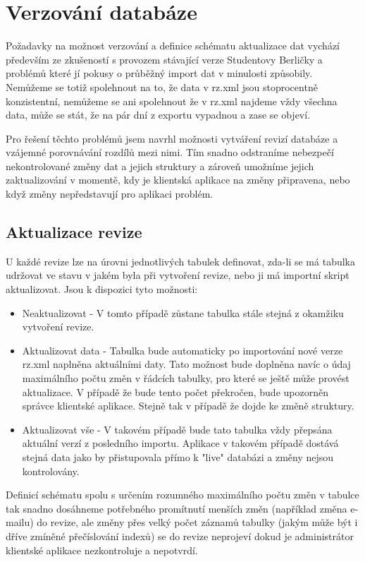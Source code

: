 \documentclass[11pt,twoside,a4paper]{book}
\begin{document}
\section{Verzování databáze}
Požadavky na možnost verzování a definice schématu aktualizace dat vychází především ze zkušeností s provozem stávající verze Studentovy Berličky a problémů které jí pokusy o průběžný import dat v minulosti způsobily. Nemůžeme se totiž spolehnout na to, že data v rz.xml jsou stoprocentně konzistentní, nemůžeme se ani spolehnout že v rz.xml najdeme vždy všechna data, může se stát, že na pár dní z exportu vypadnou a zase se objeví.

Pro řešení těchto problémů jsem navrhl možnosti vytváření revizí databáze a vzájemné porovnávání rozdílů mezi nimi. Tím snadno odstraníme nebezpečí nekontrolované změny dat a jejich struktury a zároveň umožníme jejich zaktualizování v momentě, kdy je klientská aplikace na změny připravena, nebo když změny nepředstavují pro aplikaci problém.

\subsection{Aktualizace revize}
U každé revize lze na úrovni jednotlivých tabulek definovat, zda-li se má tabulka udržovat ve stavu v jakém byla při vytvoření revize, nebo ji má importní skript aktualizovat. Jsou k dispozici tyto možnosti:

\begin{itemize}
\item Neaktualizovat - V tomto případě zůstane tabulka stále stejná z okamžiku vytvoření revize.
\item Aktualizovat data - Tabulka bude automaticky po importování nové verze rz.xml naplněna aktuálními daty. Tato možnost bude doplněna navíc o údaj maximálního počtu změn v řádcích tabulky, pro které se ještě může provést aktualizace. V případě že bude tento počet překročen, bude upozorněn správce klientské aplikace. Stejně tak v případě že dojde ke změně struktury.
\item Aktualizovat vše - V takovém případě bude tato tabulka vždy přepsána aktuální verzí z posledního importu. Aplikace v takovém případě dostává stejná data jako by přistupovala přímo k "live" databázi a změny nejsou kontrolovány.
\end{itemize}

Definicí schématu  spolu s určením rozumného maximálního počtu změn v tabulce tak snadno dosáhneme potřebného promítnutí menších změn (například změna e-mailu) do revize, ale změny přes velký počet záznamů tabulky (jakým může být i dříve zmíněné přečíslování indexů) se do revize neprojeví dokud je administrátor klientské aplikace nezkontroluje a nepotvrdí.
\end{document}

